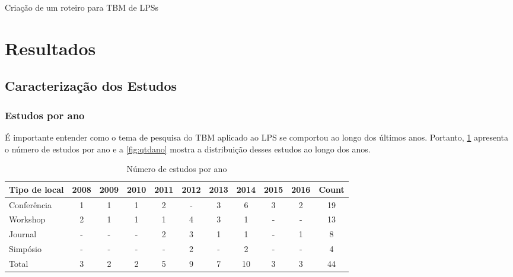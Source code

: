 Criação de um roteiro para TBM de LPSs

\section{Resultados}
\label{sec:secmsl_results}

\subsection{Caracterização dos Estudos}

\subsubsection{Estudos por ano}

É importante entender como o tema de pesquisa do TBM aplicado ao LPS se comportou ao longo dos últimos anos. Portanto, \ref{table:listaano} apresenta o número de estudos por ano e a \ref{fig:qtdano} mostra a distribuição desses estudos ao longo dos anos.

\begin{table}[!h]
	\centering
	\tiny
	\caption{Número de estudos por ano}
	\label{table:listaano}
	
	\begin{tabular}{l|c|c|c|c|c|c|c|c|c|c} \hline 
		
		\textbf{Tipo de local} & \textbf{2008} & \textbf{2009} & \textbf{2010} & \textbf{2011} & \textbf{2012} & \textbf{2013} & \textbf{2014} & \textbf{2015} & \textbf{2016} & \textbf{Count}\\\hline \hline
		
		
		Conferência &  1 & 1 & 1 & 2 & - & 3 & 6 & 3 & 2 & 19 \\\hline
		
		Workshop &  2 & 1 & 1 & 1 & 4 & 3 & 1 & - & - & 13 \\\hline
		
		Journal &  - & - & - & 2 & 3 & 1 & 1 & - & 1 & 8 \\\hline
		
		Simpósio & - & - & - & - & 2 & - & 2 & - & - & 4 \\\hline
		
		Total &  3 & 2 & 2 & 5 & 9 & 7 & 10 & 3 & 3 & 44 \\\hline
		
		
		
	\end{tabular}
\end{table}

